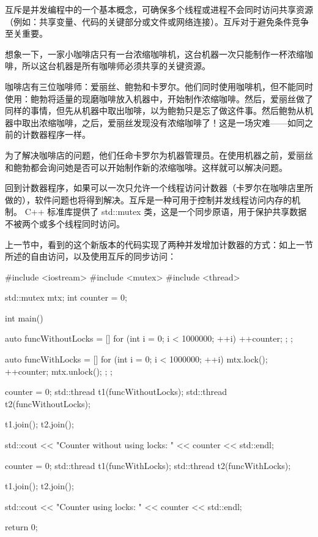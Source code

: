 
互斥是并发编程中的一个基本概念，可确保多个线程或进程不会同时访问共享资源（例如：共享变量、代码的关键部分或文件或网络连接）。互斥对于避免条件竞争至关重要。

想象一下，一家小咖啡店只有一台浓缩咖啡机，这台机器一次只能制作一杯浓缩咖啡，所以这台机器是所有咖啡师必须共享的关键资源。

咖啡店有三位咖啡师：爱丽丝、鲍勃和卡罗尔。他们同时使用咖啡机，但不能同时使用：鲍勃将适量的现磨咖啡放入机器中，开始制作浓缩咖啡。然后，爱丽丝做了同样的事情，但先从机器中取出咖啡，以为鲍勃只是忘了做这件事。然后鲍勃从机器中取出浓缩咖啡，之后，爱丽丝发现没有浓缩咖啡了！这是一场灾难——如同之前的计数器程序一样。

为了解决咖啡店的问题，他们任命卡罗尔为机器管理员。在使用机器之前，爱丽丝和鲍勃都会询问她是否可以开始制作新的浓缩咖啡。这样就可以解决问题。

回到计数器程序，如果可以一次只允许一个线程访问计数器（卡罗尔在咖啡店里所做的），软件问题也将得到解决。互斥是一种可用于控制并发线程访问内存的机制。 C++ 标准库提供了 std::mutex 类，这是一个同步原语，用于保护共享数据不被两个或多个线程同时访问。

上一节中，看到的这个新版本的代码实现了两种并发增加计数器的方式：如上一节所述的自由访问，以及使用互斥的同步访问：

\begin{cpp}
#include <iostream>
#include <mutex>
#include <thread>

std::mutex mtx;
int counter = 0;

int main() {
    auto funcWithoutLocks = [] {
        for (int i = 0; i < 1000000; ++i) {
            ++counter;
        };
    };

    auto funcWithLocks = [] {
        for (int i = 0; i < 1000000; ++i) {
            mtx.lock();
            ++counter;
            mtx.unlock();
        };
    };

    {
        counter = 0;
        std::thread t1(funcWithoutLocks);
        std::thread t2(funcWithoutLocks);

        t1.join();
        t2.join();

        std::cout << "Counter without using locks: " << counter <<
        std::endl;
    } {
        counter = 0;
        std::thread t1(funcWithLocks);
        std::thread t2(funcWithLocks);

        t1.join();
        t2.join();

        std::cout << "Counter using locks: " << counter << std::endl;
    }
    return 0;
}
\end{cpp}

